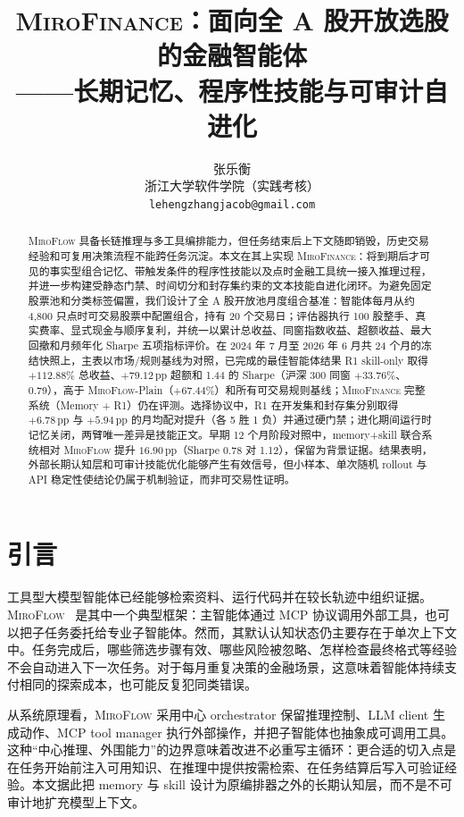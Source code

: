 \documentclass[11pt]{article}
\title{\textsc{MiroFinance}：面向全 A 股开放选股的金融智能体\\
——长期记忆、程序性技能与可审计自进化}
\author{张乐衡 \\
  浙江大学软件学院（实践考核） \\
  \texttt{lehengzhangjacob@gmail.com}}
\newcommand{\miroflow}{\textsc{MiroFlow}}
\newcommand{\memskill}{\textsc{MiroFinance}}
\newcommand{\pp}{\,\mathrm{pp}}
\begin{document}
\maketitle

\begin{abstract}
\miroflow{} 具备长链推理与多工具编排能力，但任务结束后上下文随即销毁，历史交易经验和可复用决策流程不能跨任务沉淀。本文在其上实现 \memskill{}：将到期后才可见的事实型组合记忆、带触发条件的程序性技能以及点时金融工具统一接入推理过程，并进一步构建受静态门禁、时间切分和封存集约束的文本技能自进化闭环。为避免固定股票池和分类标签偏置，我们设计了全 A 股开放池月度组合基准：智能体每月从约 4,800 只点时可交易股票中配置组合，持有 20 个交易日；评估器执行 100 股整手、真实费率、显式现金与顺序复利，并统一以累计总收益、同窗指数收益、超额收益、最大回撤和月频年化 Sharpe 五项指标评价。在 2024 年 7 月至 2026 年 6 月共 24 个月的冻结快照上，主表以市场/规则基线为对照，已完成的最佳智能体结果 R1 skill-only 取得 $+112.88\%$ 总收益、$+79.12\pp$ 超额和 1.44 的 Sharpe（沪深 300 同窗 $+33.76\%$、0.79），高于 \miroflow{}-Plain（$+67.44\%$）和所有可交易规则基线；\memskill{} 完整系统（Memory + R1）仍在评测。选择协议中，R1 在开发集和封存集分别取得 $+6.78\pp$ 与 $+5.94\pp$ 的月均配对提升（各 5 胜 1 负）并通过硬门禁；进化期间运行时记忆关闭，两臂唯一差异是技能正文。早期 12 个月阶段对照中，memory+skill 联合系统相对 \miroflow{} 提升 $16.90\pp$（Sharpe 0.78 对 1.12），保留为背景证据。结果表明，外部长期认知层和可审计技能优化能够产生有效信号，但小样本、单次随机 rollout 与 API 稳定性使结论仍属于机制验证，而非可交易性证明。
\end{abstract}

\section{引言}
\label{sec:intro}

工具型大模型智能体已经能够检索资料、运行代码并在较长轨迹中组织证据。\miroflow{}~\citep{miroflow2025} 是其中一个典型框架：主智能体通过 MCP 协议调用外部工具，也可以把子任务委托给专业子智能体。然而，其默认认知状态仍主要存在于单次上下文中。任务完成后，哪些筛选步骤有效、哪些风险被忽略、怎样检查最终格式等经验不会自动进入下一次任务。对于每月重复决策的金融场景，这意味着智能体持续支付相同的探索成本，也可能反复犯同类错误。

从系统原理看，\miroflow{} 采用中心 orchestrator 保留推理控制、LLM client 生成动作、MCP tool manager 执行外部操作，并把子智能体也抽象成可调用工具。这种``中心推理、外围能力''的边界意味着改进不必重写主循环：更合适的切入点是在任务开始前注入可用知识、在推理中提供按需检索、在任务结算后写入可验证经验。本文据此把 memory 与 skill 设计为原编排器之外的长期认知层，而不是不可审计地扩充模型上下文。
\end{document}
